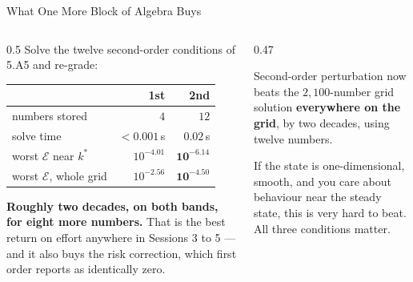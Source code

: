 \begin{frame}{What One More Block of Algebra Buys}
\begin{columns}[T]
\begin{column}{0.5\textwidth}
\small
Solve the twelve second-order conditions of 5.A5 and re-grade:
\medskip
\begin{center}\footnotesize
\begin{tabularx}{\linewidth}{@{}>{\raggedright\arraybackslash}X r r@{}}
\toprule
 & \textbf{1st} & \textbf{2nd} \\
\midrule
numbers stored & $4$ & $12$ \\
solve time & $<0.001$\,s & $0.02$\,s \\
worst $\mathcal{E}$ near $k^{*}$ & $10^{-4.01}$ & $\mathbf{10^{-6.14}}$ \\
worst $\mathcal{E}$, whole grid & $10^{-2.56}$ & $\mathbf{10^{-4.50}}$ \\
\bottomrule
\end{tabularx}
\end{center}
\medskip
\textbf{Roughly two decades, on both bands, for eight more numbers.} That is the best return on effort anywhere in Sessions 3 to 5 --- and it also buys the risk correction, which first order reports as identically zero.
\end{column}
\begin{column}{0.47\textwidth}
\begin{takeawaybox}\footnotesize
Second-order perturbation now beats the $2{,}100$-number grid solution \textbf{everywhere on the grid}, by two decades, using twelve numbers.
\end{takeawaybox}
\medskip
\begin{examplebox}\footnotesize
If the state is one-dimensional, smooth, and you care about behaviour near the steady state, this is very hard to beat. All three conditions matter.
\end{examplebox}
\end{column}
\end{columns}
\vspace{1mm}
\end{frame}

